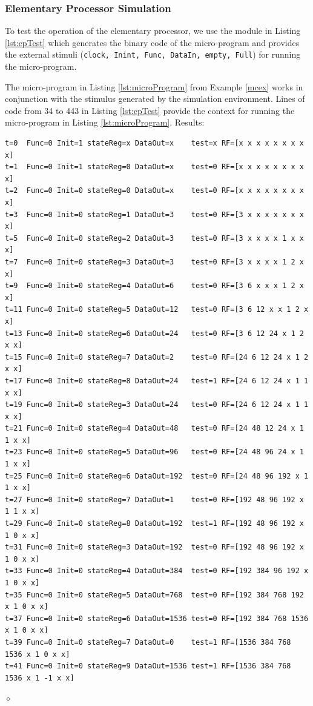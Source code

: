 \subsubsection{Elementary Processor Simulation}\label{elProcSim}

To test the operation of the elementary processor, we use the module in Listing \ref{lst:epTest} which generates the binary code of the micro-program and provides the external stimuli ({\tt clock, Inint, Func, DataIn, empty, Full}) for running the micro-program.


\begin{exemplu}
The micro-program in Listing  \ref{lst:microProgram}  from Example \ref{mcex} works in conjunction with the stimulus generated by the simulation environment. Lines of code from 34 to 443 in Listing \ref{lst:epTest} provide the context for running the micro-program in Listing  \ref{lst:microProgram}. Results:
{\small
\begin{verbatim}
t=0  Func=0 Init=1 stateReg=x DataOut=x    test=x RF=[x x x x x x x x x]
t=1  Func=0 Init=1 stateReg=0 DataOut=x    test=0 RF=[x x x x x x x x x]
t=2  Func=0 Init=0 stateReg=0 DataOut=x    test=0 RF=[x x x x x x x x x]
t=3  Func=0 Init=0 stateReg=1 DataOut=3    test=0 RF=[3 x x x x x x x x]
t=5  Func=0 Init=0 stateReg=2 DataOut=3    test=0 RF=[3 x x x x 1 x x x]
t=7  Func=0 Init=0 stateReg=3 DataOut=3    test=0 RF=[3 x x x x 1 2 x x]
t=9  Func=0 Init=0 stateReg=4 DataOut=6    test=0 RF=[3 6 x x x 1 2 x x]
t=11 Func=0 Init=0 stateReg=5 DataOut=12   test=0 RF=[3 6 12 x x 1 2 x x]
t=13 Func=0 Init=0 stateReg=6 DataOut=24   test=0 RF=[3 6 12 24 x 1 2 x x]
t=15 Func=0 Init=0 stateReg=7 DataOut=2    test=0 RF=[24 6 12 24 x 1 2 x x]
t=17 Func=0 Init=0 stateReg=8 DataOut=24   test=1 RF=[24 6 12 24 x 1 1 x x]
t=19 Func=0 Init=0 stateReg=3 DataOut=24   test=0 RF=[24 6 12 24 x 1 1 x x]
t=21 Func=0 Init=0 stateReg=4 DataOut=48   test=0 RF=[24 48 12 24 x 1 1 x x]
t=23 Func=0 Init=0 stateReg=5 DataOut=96   test=0 RF=[24 48 96 24 x 1 1 x x]
t=25 Func=0 Init=0 stateReg=6 DataOut=192  test=0 RF=[24 48 96 192 x 1 1 x x]
t=27 Func=0 Init=0 stateReg=7 DataOut=1    test=0 RF=[192 48 96 192 x 1 1 x x]
t=29 Func=0 Init=0 stateReg=8 DataOut=192  test=1 RF=[192 48 96 192 x 1 0 x x]
t=31 Func=0 Init=0 stateReg=3 DataOut=192  test=0 RF=[192 48 96 192 x 1 0 x x]
t=33 Func=0 Init=0 stateReg=4 DataOut=384  test=0 RF=[192 384 96 192 x 1 0 x x]
t=35 Func=0 Init=0 stateReg=5 DataOut=768  test=0 RF=[192 384 768 192 x 1 0 x x]
t=37 Func=0 Init=0 stateReg=6 DataOut=1536 test=0 RF=[192 384 768 1536 x 1 0 x x]
t=39 Func=0 Init=0 stateReg=7 DataOut=0    test=1 RF=[1536 384 768 1536 x 1 0 x x]
t=41 Func=0 Init=0 stateReg=9 DataOut=1536 test=1 RF=[1536 384 768 1536 x 1 -1 x x]
\end{verbatim}
}

$\diamond$
\end{exemplu}



